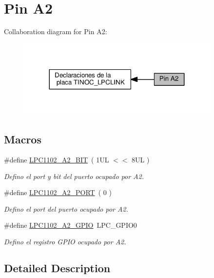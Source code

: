 \hypertarget{group___p_i_n_a2}{}\section{Pin A2}
\label{group___p_i_n_a2}
Collaboration diagram for Pin A2\+:\nopagebreak
\begin{figure}[H]
\begin{center}
\leavevmode
\includegraphics[width=287pt]{group___p_i_n_a2}
\end{center}
\end{figure}
\subsection*{Macros}
\begin{DoxyCompactItemize}
\item 
\#define \hyperlink{group___p_i_n_a2_ga468d2953fb3f21789957ee47f63e7c63}{L\+P\+C1102\+\_\+\+A2\+\_\+\+B\+IT}~( 1\+U\+L $<$$<$ 8\+U\+L )
\begin{DoxyCompactList}\small\item\em Defino el port y bit del puerto ocupado por A2. \end{DoxyCompactList}\item 
\#define \hyperlink{group___p_i_n_a2_gaab2a521ccd24403022ea360f4ba721bc}{L\+P\+C1102\+\_\+\+A2\+\_\+\+P\+O\+RT}~( 0 )
\begin{DoxyCompactList}\small\item\em Defino el port del puerto ocupado por A2. \end{DoxyCompactList}\item 
\#define \hyperlink{group___p_i_n_a2_ga0d6606e66c7be93dff6911f06846baea}{L\+P\+C1102\+\_\+\+A2\+\_\+\+G\+P\+IO}~L\+P\+C\+\_\+\+G\+P\+I\+O0
\begin{DoxyCompactList}\small\item\em Defino el registro G\+P\+IO ocupado por A2. \end{DoxyCompactList}\end{DoxyCompactItemize}


\subsection{Detailed Description}



